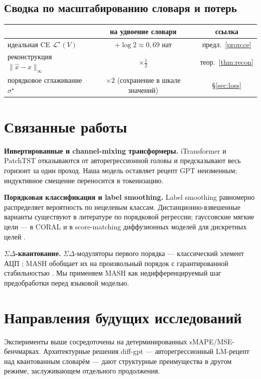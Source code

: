 \documentclass[11pt]{article}
\theoremstyle{remark}
\begin{document}
\subsection{Сводка по масштабированию словаря и потерь}
\begin{center}
\begin{tabular}{lcc}
\toprule
                         & на удвоение словаря & ссылка \\
\midrule
идеальная CE $\mathcal L^\star(V)$   & $+\log 2 \approx 0{,}69$ нат & предл.~\ref{prop:ce} \\
реконструкция $\|\hat x - x\|_\infty$ & $\times \tfrac12$ & теор.~\ref{thm:recon} \\
порядковое сглаживание $\sigma^\star$ & $\times 2$ (сохранение в шкале значений) & \S\ref{sec:loss} \\
\bottomrule
\end{tabular}
\end{center}

\section{Связанные работы}

\textbf{Инвертированные и channel-mixing трансформеры.} iTransformer
\cite{itransformer2024} и PatchTST \cite{patchtst2023} отказываются от
авторегрессионной головы и предсказывают весь горизонт за один проход.
Наша модель оставляет рецепт GPT неизменным; индуктивное смещение
переносится в токенизацию.

\textbf{Порядковая классификация и label smoothing.} Label smoothing
\cite{szegedy2016} равномерно распределяет вероятность по нецелевым
классам. Дистанционно-взвешенные варианты существуют в литературе по
порядковой регрессии; гауссовские мягкие цели --- в CORAL
\cite{cao2020} и в score-matching диффузионных моделей для дискретных
целей \cite{austin2021}.

\textbf{$\Sigma\Delta$-квантование.} $\Sigma\Delta$-модуляторы первого
порядка --- классический элемент АЦП \cite{candy1992}; MASH обобщает их
на произвольный порядок с гарантированной стабильностью
\cite{hayashi1986}. Мы применяем MASH как недифференцируемый шаг
предобработки перед языковой моделью.

\section{Направления будущих исследований}
\label{sec:future}

Эксперименты выше сосредоточены на детерминированных sMAPE/MSE-бенч\-ма\-р\-ках.
Архитектурные решения diff-gpt --- авторегрессионный LM-рецепт над
квантованным словарём --- дают структурные преимущества в другом
режиме, заслуживающем отдельного продолжения.
\end{document}
